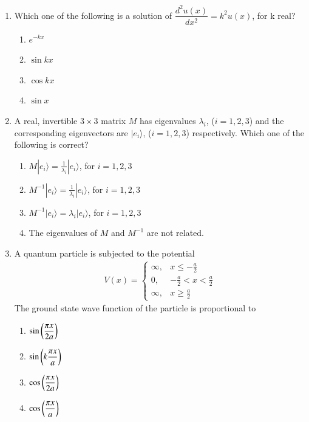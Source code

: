 \documentclass[journal,12pt,onecolumn]{IEEEtran}
\theoremstyle{remark}
\begin{document}
\begin{enumerate}
    \item Which one of the following is a solution of
    $ \dfrac{d^2 u(x)}{dx^2} = k^2 u(x)$, for k real?
    
    
    \begin{enumerate} 
        \item $e^{-kx}$
        \item $\sin kx$
        \item $\cos kx$
        \item $\sin x$
    \end{enumerate}
   

    \item A real, invertible $3 \times 3$ matrix $M$ has eigenvalues $\lambda_i$, ($i=1,2,3$) and the corresponding eigenvectors are $|e_i\rangle$, ($i=1,2,3$) respectively. Which one of the following is correct?
   
    \begin{enumerate}
        \item $M |e_i\rangle = \frac{1}{\lambda_i} |e_i\rangle$, for $i = 1,2,3$
        \item $M^{-1} |e_i\rangle = \frac{1}{\lambda_i} |e_i\rangle$, for $i = 1,2,3$
        \item $M^{-1}|e_i\rangle = \lambda_i |e_i\rangle$, for $i = 1,2,3$
        \item The eigenvalues of $M$ and $M^{-1}$ are not related.
    \end{enumerate}
    
    \item A quantum particle is subjected to the potential
    \begin{align}
          V(x) = \begin{cases}
            \infty, & x \leq -\frac{a}{2} \\
            0, & -\frac{a}{2} < x < \frac{a}{2} \\
            \infty, & x \geq \frac{a}{2}
        \end{cases}
     \end{align}
    The ground state wave function of the particle is proportional to
    
    \begin{enumerate}
        \item $\sin\left(\dfrac{\pi x}{2a}\right)$
        \item $\sin\left(k\dfrac{\pi x}{a}\right)$
        \item $\cos\left(\dfrac{\pi x}{2a}\right)$
        \item $\cos\left(\dfrac{\pi x}{a}\right)$
    \end{enumerate}
   


\end{enumerate}
\end{document}
